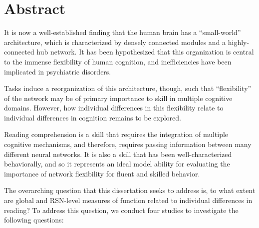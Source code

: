 \chapter{Abstract}


It is now a well-established finding that the human brain has a ``small-world'' architecture, which is characterized by densely connected modules and a highly-connected hub network. It has been hypothesized that this organization is central to the immense flexibility of human cognition, and inefficiencies have been implicated in psychiatric disorders. 

Tasks induce a reorganization of this architecture, though, such that ``flexibility'' of the network may be of primary importance to skill in multiple cognitive domains. However, how individual differences in this flexibility relate to individual differences in cognition remains to be explored.

Reading comprehension is a skill that requires the integration of multiple cognitive mechanisms, and therefore, requires passing information between many different neural networks. It is also a skill that has been well-characterized behaviorally, and so it represents an ideal model ability for evaluating the importance of network flexibility for fluent and skilled behavior.

The overarching question that this dissertation seeks to address is, to what extent are global and RSN-level measures of function related to individual differences in reading? To address this question, we conduct four studies to investigate the following questions:


